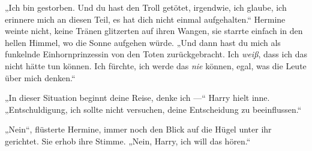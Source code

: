 „Ich bin gestorben. Und du hast den Troll getötet, irgendwie, ich glaube, ich erinnere mich an diesen Teil, es hat dich nicht einmal aufgehalten.“ Hermine weinte nicht, keine Tränen glitzerten auf ihren Wangen, sie starrte einfach in den hellen Himmel, wo die Sonne aufgehen würde.
„Und dann hast du mich als funkelnde Einhornprinzessin von den Toten zurückgebracht. Ich \emph{weiß}, dass ich das nicht hätte tun können. Ich fürchte, ich werde das \emph{nie} können, egal, was die Leute über mich denken.“

„In dieser Situation beginnt deine Reise, denke ich —“ Harry hielt inne.
„Entschuldigung, ich sollte nicht versuchen, deine Entscheidung zu beeinflussen.“

„Nein“, flüsterte Hermine, immer noch den Blick auf die Hügel unter ihr gerichtet. Sie erhob ihre Stimme.
„Nein, Harry, ich will das hören.“

